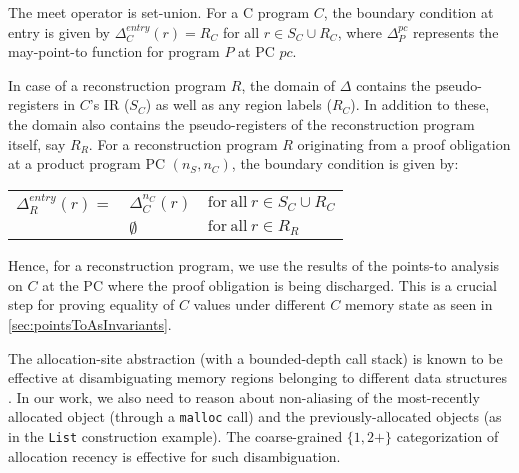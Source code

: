 The meet operator is set-union.
For a C program $C$, the boundary condition at entry is given by
$\Delta_C^{entry}(r)=R_C$ for all $r\in{}S_C\cup{}R_C$,
where $\Delta_P^{pc}$ represents the may-point-to function
for program $P$ at PC $pc$.

In case of a reconstruction program $R$, the domain of $\Delta$ contains the pseudo-registers in $C$'s IR ($S_C$) as well as
any region labels ($R_C$). In addition to these, the domain also contains the pseudo-registers
of the reconstruction program itself, say $R_R$. For a reconstruction program $R$ originating from a proof obligation
at a product program PC $(n_S,n_C)$, the boundary condition is given by:

\begin{center}
\begin{tabular}{rll}
$\Delta^{entry}_R(r)=$ & $\Delta^{n_C}_C(r)$ & $\mathrm{for\ all}\ r \in{}S_C\cup{}R_C$ \\
& $\emptyset$ & $\mathrm{for\ all}\ r \in{}R_R$ \\
\end{tabular}
\end{center}

Hence, for a reconstruction program, we use the results of the points-to analysis on $C$ at the PC where
the proof obligation is being discharged. This is a crucial step for proving equality of $C$ values
under different $C$ memory state as seen in \cref{sec:pointsToAsInvariants}.

The allocation-site abstraction (with a bounded-depth call stack) is
known to be effective at disambiguating memory regions belonging to
different data structures
\cite{allocationSiteAbstraction82,allocationSiteAbstraction90,allocationSiteAbstraction06}.
In our work, we also need to reason about non-aliasing
of the most-recently allocated object (through a {\tt malloc} call) and
the previously-allocated objects (as in the {\tt List}
construction example). The coarse-grained $\{1, 2+\}$
categorization of allocation recency is effective for such
disambiguation.